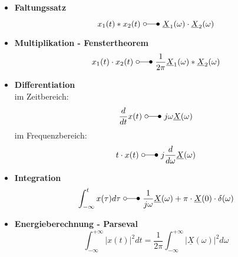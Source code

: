 \begin{mdframed}[style=exercise,nobreak=false]
\begin{itemize}
    \item \textbf{Faltungssatz}
        \[
            x_{1}(t) * x_{2}(t)\ \laplace\ \underline{X}_{1}(\omega) \cdot \underline{X}_{2}(\omega)
        \]
    \item \textbf{Multiplikation - Fenstertheorem}
        \[
            x_{1}(t) \cdot x_{2}(t)\ \laplace\ \frac{1}{2 \pi} \underline{X}_{1}(\omega) * \underline{X}_{2}(\omega)
        \]
    \item \textbf{Differentiation\\}
        {\small im Zeitbereich:}
        \[
            \frac{d}{dt} x(t) \ \laplace\ j\omega\underline{X}(\omega)
        \]
        {\small im Frequenzbereich:}
        \[
            t \cdot x(t)\ \laplace\ j \frac{d}{d \omega} \underline{X}(\omega)
        \]
    \item \textbf{Integration}
        \[
            \int_{-\infty}^{t} x(\tau) d \tau\ \laplace\ \frac{1}{j \omega} \underline{X}(\omega)+\pi \cdot \underline{X}(0) \cdot \delta(\omega)
        \]
    \item \textbf{Energieberechnung - Parseval}
        \[
            \int_{-\infty}^{+\infty}|x(t)|^{2} d t=\frac{1}{2 \pi} \int_{-\infty}^{+\infty}|\underline{X}(\omega)|^{2} d \omega
        \]
\end{itemize}
\end{mdframed}
